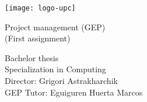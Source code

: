 
\thispagestyle{empty}
\clearpage
\setcounter{page}{-1}

\makeatletter
\begin{titlepage}
{
    \centering
    \texttt{[image: logo-upc]}
    \null
    \vspace{3em}
    {\Huge \bfseries \@title \par}
    \vspace{2em}
    {\large Project management (GEP) \\
        (First assignment)
    \par}
    \vspace{3em}
    {\large \scshape \@date \par}

    \vfill
    {\raggedleft \large \bfseries \@author \par}
    \vspace{1em}
    {\raggedleft \large
        Bachelor thesis \\
        Specialization in Computing \\
        \vspace{2em}
        Director: Grigori Astrakharchik \\
        GEP Tutor: Eguiguren Huerta Marcos
    \par}
}
\end{titlepage}
\makeatother
